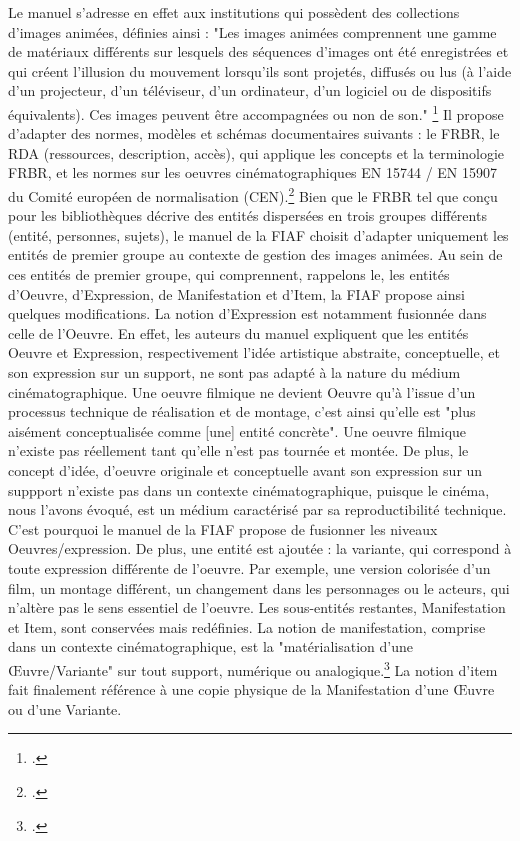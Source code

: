 Le manuel s'adresse en effet aux institutions qui possèdent des collections d'images animées, définies ainsi : "Les images animées comprennent une gamme de matériaux différents sur lesquels des séquences d'images ont été enregistrées et qui créent l'illusion du mouvement lorsqu'ils sont projetés, diffusés ou lus (à l'aide d'un projecteur, d'un téléviseur, d'un ordinateur, d’un logiciel ou de dispositifs équivalents). Ces images peuvent être accompagnées ou non de son." \footcite{zotero-item-646}
Il propose d'adapter des normes, modèles et schémas documentaires suivants :  le FRBR, le RDA (ressources, description, accès), qui applique les concepts et la terminologie FRBR, et les normes sur les oeuvres cinématographiques EN 15744 / EN 15907 du Comité européen de normalisation (CEN).\footcite{zotero-item-646}
Bien que le FRBR tel que conçu pour les bibliothèques décrive des entités dispersées en trois groupes différents (entité, personnes, sujets), le manuel de la FIAF choisit d'adapter uniquement les entités de premier groupe au contexte de gestion des images animées. 
Au sein de ces entités de premier groupe, qui comprennent, rappelons le, les entités d'Oeuvre, d'Expression, de Manifestation et d'Item, la FIAF propose ainsi quelques modifications. La notion d'Expression est notamment fusionnée dans celle de l'Oeuvre. En effet, les auteurs du manuel expliquent que les entités Oeuvre et Expression, respectivement l'idée artistique abstraite, conceptuelle, et son expression sur un support, ne sont pas adapté à la nature du médium cinématographique. Une oeuvre filmique ne devient Oeuvre qu'à l'issue d'un processus technique de réalisation et de montage, c'est ainsi qu'elle est "plus aisément conceptualisée comme [une] entité concrète". Une oeuvre filmique n'existe pas réellement tant qu'elle n'est pas tournée et montée. De plus, le concept d'idée, d'oeuvre originale et conceptuelle avant son expression sur un suppport n'existe pas dans un contexte cinématographique, puisque le cinéma, nous l'avons évoqué, est un médium caractérisé par sa reproductibilité technique. C'est pourquoi le manuel de la FIAF propose de fusionner les niveaux Oeuvres/expression.
De plus, une entité est ajoutée : la variante, qui correspond à toute expression différente de l'oeuvre. Par exemple, une version colorisée d'un film, un montage différent, un changement dans les personnages ou le acteurs, qui n'altère pas le sens essentiel de l'oeuvre.
Les sous-entités restantes, Manifestation et Item, sont conservées mais redéfinies. La notion de manifestation, comprise dans un contexte cinématographique, est la "matérialisation d'une Œuvre/Variante" sur tout support, numérique ou analogique.\footcite{zotero-item-646} La notion d'item fait finalement référence à une copie physique de la Manifestation d'une Œuvre ou d'une Variante.
